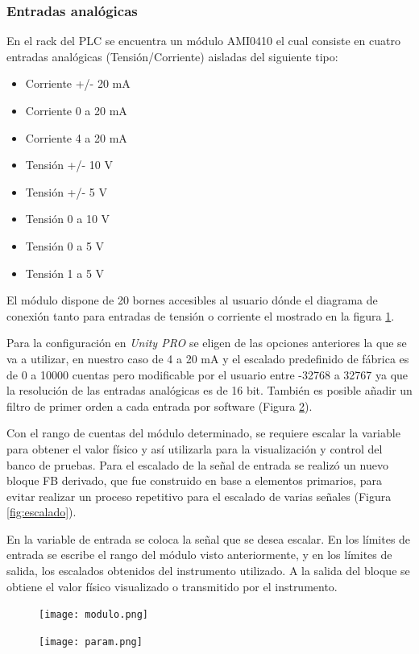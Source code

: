 \subsubsection{Entradas analógicas}
En el rack del PLC se encuentra un módulo AMI0410 el cual consiste en cuatro entradas analógicas (Tensión/Corriente) aisladas del siguiente tipo:
\begin{itemize}
	\item Corriente +/- 20 mA
\item 	Corriente 0 a 20 mA
\item 	Corriente 4 a 20 mA
\item 	Tensión +/- 10 V
\item 	Tensión +/- 5 V
\item 	Tensión 0 a 10 V
\item 	Tensión 0 a 5 V
\item 	Tensión 1 a 5 V
	
\end{itemize}

El módulo dispone de 20 bornes accesibles al usuario dónde el diagrama de conexión tanto para entradas de tensión o corriente el mostrado en la figura \ref{fig:modulo}.

Para la configuración en \textit{Unity PRO} se eligen de las opciones anteriores la que se va a utilizar, en nuestro caso de 4 a 20 mA y el escalado predefinido de fábrica es de 0 a 10000 cuentas pero modificable por el usuario entre -32768 a 32767 ya que la resolución de las entradas analógicas es de 16 bit. También es posible añadir un filtro de primer orden a cada entrada por software (Figura \ref{fig:param}).

Con el rango de cuentas del módulo determinado, se requiere escalar la variable para obtener el valor físico y así utilizarla para la visualización y control del banco de pruebas.
Para el escalado de la señal de entrada se realizó un nuevo bloque FB derivado, que fue construido en base a elementos primarios, para evitar realizar un proceso repetitivo para el escalado de varias señales (Figura \ref{fig:escalado}).

En la variable de entrada se coloca la señal que se desea escalar. En los límites de entrada se escribe el rango del módulo visto anteriormente, y en los límites de salida, los escalados obtenidos del instrumento utilizado. A la salida del bloque se obtiene el valor físico visualizado o transmitido por el instrumento.

\begin{figure}[H]
	\centering
	\texttt{[image: modulo.png]}
	\label{fig:modulo}
\end{figure}
\begin{figure}[H]
	\centering
	\texttt{[image: param.png]}
	\label{fig:param}
\end{figure}

